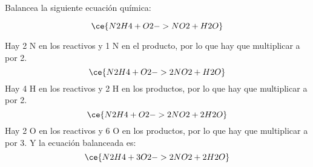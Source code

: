 Balancea la siguiente ecuación química:

\[
    \ce{N2H4 + O2 -> NO2 + H2O}
\]

\begin{solutionbox}{6.5cm}
    Hay 2 N en los reactivos y 1 N en el producto, por lo que hay que multiplicar a  por 2.
    \[
        \ce{N2H4 + O2 -> 2NO2 + H2O}
    \]
    Hay 4 H en los reactivos y 2 H en los productos, por lo que hay que multiplicar a  por 2.
    \[
        \ce{N2H4 + O2 -> 2NO2 + 2H2O}
    \]
    Hay 2 O en los reactivos y 6 O en los productos, por lo que hay que multiplicar a  por 3. Y la ecuación balanceada es:
    \[
        \ce{N2H4 + 3O2 -> 2NO2 + 2H2O}
    \]
\end{solutionbox}